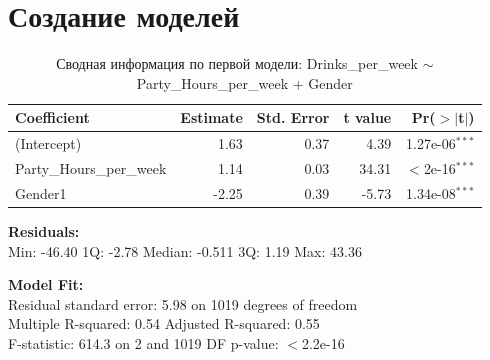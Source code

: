 \chapter{Создание моделей}


\begin{table}[h]
	\centering
	\caption{Сводная информация по первой модели: Drinks\_per\_week $\sim$ Party\_Hours\_per\_week + Gender}
	\begin{tabular}{lrrrr}
		\hline
		\textbf{Coefficient} & \textbf{Estimate} & \textbf{Std. Error} & \textbf{t value} & \textbf{Pr($>$$|$t$|$)} \\
		\hline
		(Intercept)             & 1.63 & 0.37 & 4.39  & 1.27e-06$^{***}$ \\
		Party\_Hours\_per\_week & 1.14 & 0.03 & 34.31 & $<$2e-16$^{***}$ \\
		Gender1                 & -2.25 & 0.39 & -5.73 & 1.34e-08$^{***}$ \\
		\hline
	\end{tabular}
	
	\vspace{0.5em}
	\textbf{Residuals:}\\
	Min: -46.40 \quad 1Q: -2.78 \quad Median: -0.511 \quad 3Q: 1.19 \quad Max: 43.36
	
	\vspace{0.5em}
	\textbf{Model Fit:}\\
	Residual standard error: 5.98 on 1019 degrees of freedom \\
	Multiple R-squared: 0.54 \quad Adjusted R-squared: 0.55 \\
	F-statistic: 614.3 on 2 and 1019 DF \quad p-value: $<$2.2e-16
		\label{tab:m1}
\end{table}

